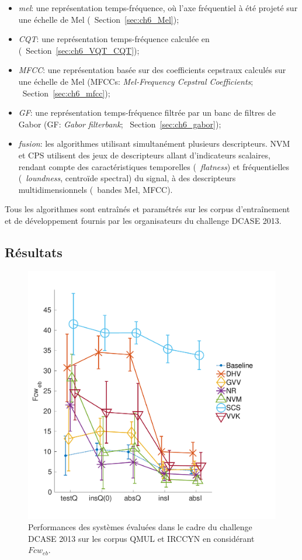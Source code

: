 \begin{itemize}
\item \emph{mel}: une représentation temps-fréquence, où l'axe fréquentiel à été projeté sur une échelle de Mel (\cf~Section~\ref{sec:ch6_Mel});
\item \emph{CQT}: une représentation temps-fréquence calculée en  (\cf~Section~\ref{sec:ch6_VQT_CQT});
\item \emph{MFCC}: une représentation basée sur des coefficients cepstraux calculés sur une échelle de Mel (MFCCs: \emph{Mel-Frequency Cepstral Coefficients}; \cf~Section~\ref{sec:ch6_mfcc});
\item \emph{GF}: une représentation temps-fréquence filtrée par un banc de filtres de Gabor (GF: \emph{Gabor filterbank}; \cf~Section~\ref{sec:ch6_gabor});
\item \emph{fusion}: les algorithmes utilisant simultanément plusieurs descripteurs. NVM et CPS utilisent des jeux de descripteurs allant d'indicateurs scalaires, rendant compte des caractéristiques temporelles (\eg~\emph{flatness}) et fréquentielles (\eg~\emph{loundness}, centroïde spectral) du signal, à des descripteurs multidimensionnels (\eg~bandes Mel, MFCC).
\end{itemize}


Tous les algorithmes sont entraînés et paramétrés sur les corpus d'entraînement et de développement fournis par les organisateurs du challenge DCASE 2013. \\

\subsection{Résultats}

\begin{figure}[t]
\includegraphics[width=1\columnwidth]{gfx/ch_7/dcase2013_1}
\caption{Performances des systèmes évaluées dans le cadre du challenge DCASE 2013 sur les corpus QMUL et IRCCYN en considérant $Fcw_{eb}$.}
\label{fig:irccyn}
\end{figure}

